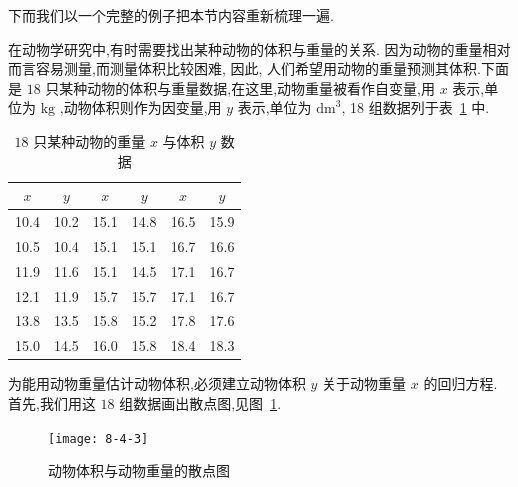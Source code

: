 下而我们以一个完整的例子把本节内容重新梳理一遍.
\begin{example}\label{exam:8.4.5}
    在动物学研究中,有时需要找出某种动物的体积与重量的关系. 因为动物的重量相对而言容易测量,而测量体积比较困难, 因此, 人们希望用动物的重量预测其体积.下面是 $18$ 只某种动物的体积与重量数据,在这里,动物重量被看作自变量,用 $x$ 表示,单位为 $\si{\kilogram}$ ,动物体积则作为因变量,用 $y$ 表示,单位为 $\mathrm{dm}^3$, 18 组数据列于表~\ref{tab:8.4.4} 中.
    \begin{table}[htbp]
        \centering
        \caption{ $18$ 只某种动物的重量 $x$ 与体积 $y$ 数据}
        \begin{tabular}{cc|cc|cc}
            \hline
            $x$     & $y$     & $x$     & $y$     & $x$     & $y$ \\ \hline
            10.4  & 10.2  & 15.1  & 14.8  & 16.5  & 15.9  \\
            10.5  & 10.4  & 15.1  & 15.1  & 16.7  & 16.6  \\
            11.9  & 11.6  & 15.1  & 14.5  & 17.1  & 16.7  \\
            12.1  & 11.9  & 15.7  & 15.7  & 17.1  & 16.7  \\
            13.8  & 13.5  & 15.8  & 15.2  & 17.8  & 17.6  \\
            15.0  & 14.5  & 16.0  & 15.8  & 18.4  & 18.3  \\ \hline
        \end{tabular}%
        \label{tab:8.4.4}%
    \end{table}%
    
    为能用动物重量估计动物体积,必须建立动物体积 $y$ 关于动物重量 $x$ 的回归方程. 首先,我们用这 $18$ 组数据画出散点图,见图~\ref{fig:8.4.3}.
    \begin{figure}[!htb]
        \centering
        \texttt{[image: 8-4-3]}
        \caption{动物体积与动物重量的散点图}
        \label{fig:8.4.3}
    \end{figure}


\end{example}
